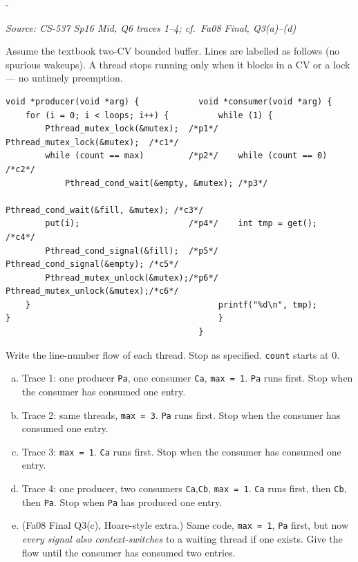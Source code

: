 \documentclass[11pt,a4paper]{article}
\makeatletter
\newcommand{\keepspace}[1]{\par\penalty-100\begingroup
  \setlength{\dimen@}{#1}\dimen@ii\pagegoal\advance\dimen@ii-\pagetotal
  \ifdim\dimen@>\dimen@ii\ifdim\dimen@ii>\z@\vfil\fi\break\fi\endgroup}
\newcounter{qn}[section]
\newenvironment{Qn}[4]{%
  \refstepcounter{qn}\keepspace{7\baselineskip}%
  \begin{tcolorbox}[qboxstyle, title={Q\thesection.\theqn\ \ [#1 \textbar\ #2]\ \ #4}]%
  {\footnotesize\color{g3}\textit{Source: #3}}\par\smallskip%
}{%
  \end{tcolorbox}%
}
\makeatother
\begin{document}
\begin{Qn}{Hard}{Lect 18}{CS-537 Sp16 Mid, Q6 traces 1--4; cf.\ Fa08 Final, Q3(a)--(d)}{Bounded-buffer traces with two CVs}
Assume the textbook two-CV bounded buffer. Lines are labelled as
follows (no spurious wakeups). A thread stops running only when it
blocks in a CV or a lock --- no untimely preemption.
\begin{lstlisting}[numbers=none]
void *producer(void *arg) {            void *consumer(void *arg) {
    for (i = 0; i < loops; i++) {          while (1) {
        Pthread_mutex_lock(&mutex);  /*p1*/    Pthread_mutex_lock(&mutex);  /*c1*/
        while (count == max)         /*p2*/    while (count == 0)           /*c2*/
            Pthread_cond_wait(&empty, &mutex); /*p3*/
                                               Pthread_cond_wait(&fill, &mutex); /*c3*/
        put(i);                      /*p4*/    int tmp = get();             /*c4*/
        Pthread_cond_signal(&fill);  /*p5*/    Pthread_cond_signal(&empty); /*c5*/
        Pthread_mutex_unlock(&mutex);/*p6*/    Pthread_mutex_unlock(&mutex);/*c6*/
    }                                      printf("%d\n", tmp);
}                                          }
                                       }
\end{lstlisting}
Write the line-number flow of each thread. Stop as specified.
\texttt{count} starts at 0.

\begin{enumerate}[(a)]
\item Trace 1: one producer \texttt{Pa}, one consumer \texttt{Ca},
      \texttt{max = 1}. \texttt{Pa} runs first. Stop when the consumer
      has consumed one entry.
\item Trace 2: same threads, \texttt{max = 3}. \texttt{Pa} runs first.
      Stop when the consumer has consumed one entry.
\item Trace 3: \texttt{max = 1}. \texttt{Ca} runs first. Stop when the
      consumer has consumed one entry.
\item Trace 4: one producer, two consumers \texttt{Ca},\texttt{Cb},
      \texttt{max = 1}. \texttt{Ca} runs first, then \texttt{Cb}, then
      \texttt{Pa}. Stop when \texttt{Pa} has produced one entry.
\item (Fa08 Final Q3(c), Hoare-style extra.) Same code, \texttt{max = 1},
      \texttt{Pa} first, but now \emph{every signal also context-switches}
      to a waiting thread if one exists. Give the flow until the
      consumer has consumed two entries.
\end{enumerate}
\end{Qn}
\end{document}

